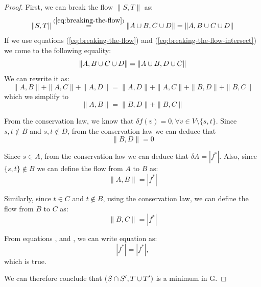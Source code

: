 \begin{proof}
First, we can break the flow $\|S,T\|$ as:
\begin{equation}
\| S, T \| \overset{(\ref{eq:breaking-the-flow})}{=} \| A \cup B , C \cup D \| = \| A, B \cup C \cup D \|
\end{equation}
If we use equations (\ref{eq:breaking-the-flow}) and (\ref{eq:breaking-the-flow-intersect}) we come to the following equality:
\begin{equation}
\| A, B \cup C \cup D \| = \| A \cup B, D \cup C \|
\end{equation}
We can rewrite it as:
\begin{equation}
\| A, B \| + \| A, C \| + \| A, D \| = \| A, D \| + \| A, C\| + \| B, D \|  + \| B, C \|
\end{equation}
which we simplify to
\begin{equation}
\| A, B\| = \| B, D \| + \| B, C \|
\label{eq:simplified-flow}
\end{equation}

From the conservation law, we know that $\delta f(v)=0, \forall v \in V \setminus \{s,t\}$.
Since ${s,t} \notin B$ and ${s,t} \notin D$, from the conservation law we can deduce that 
\begin{equation}
\| B, D \| = 0
\label{eq:bd-is-zero}
\end{equation}

Since $s \in A$, from the conservation law we can deduce that $\delta A = |f^{*}|$. Also, since $\{s, t \} \notin B$ we can define the flow from $A$ to $B$ as:
\begin{equation}
\| A, B \| = |f^{*}|
\label{eq:ab-is-f}
\end{equation}

Similarly, since $t \in C$ and $t \notin B$, using the conservation law, we can define the flow from $B$ to $C$ as:
\begin{equation}
\| B, C \| = |f^{*}|
\label{eq:bc-is-f}
\end{equation}

From equations ,  and , we can write equation  as:
\begin{equation}
|f^{*}| = |f^{*}|,
\end{equation}
which is true. 

We can therefore conclude that $(S \cap S', T \cup T')$ is a minimum \stcut{} in G.
\end{proof}


